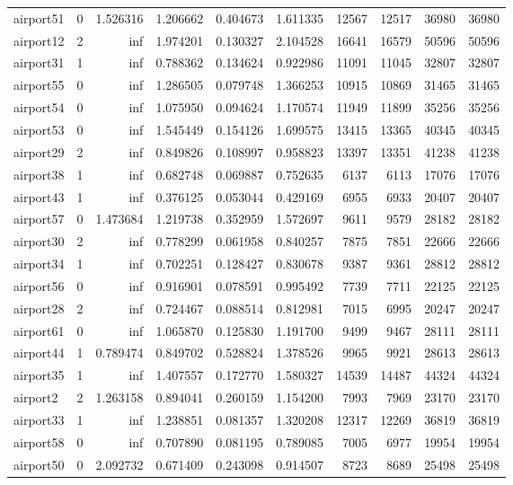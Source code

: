 \begin{longtable}{|l|r|r|r|r|r|r|r|r|r|}
airport51 & 0 & 1.526316 & 1.206662 & 0.404673 & 1.611335 & 12567 & 12517 & 36980 & 36980 \\
airport12 & 2 & inf & 1.974201 & 0.130327 & 2.104528 & 16641 & 16579 & 50596 & 50596 \\
airport31 & 1 & inf & 0.788362 & 0.134624 & 0.922986 & 11091 & 11045 & 32807 & 32807 \\
airport55 & 0 & inf & 1.286505 & 0.079748 & 1.366253 & 10915 & 10869 & 31465 & 31465 \\
airport54 & 0 & inf & 1.075950 & 0.094624 & 1.170574 & 11949 & 11899 & 35256 & 35256 \\
airport53 & 0 & inf & 1.545449 & 0.154126 & 1.699575 & 13415 & 13365 & 40345 & 40345 \\
airport29 & 2 & inf & 0.849826 & 0.108997 & 0.958823 & 13397 & 13351 & 41238 & 41238 \\
airport38 & 1 & inf & 0.682748 & 0.069887 & 0.752635 & 6137 & 6113 & 17076 & 17076 \\
airport43 & 1 & inf & 0.376125 & 0.053044 & 0.429169 & 6955 & 6933 & 20407 & 20407 \\
airport57 & 0 & 1.473684 & 1.219738 & 0.352959 & 1.572697 & 9611 & 9579 & 28182 & 28182 \\
airport30 & 2 & inf & 0.778299 & 0.061958 & 0.840257 & 7875 & 7851 & 22666 & 22666 \\
airport34 & 1 & inf & 0.702251 & 0.128427 & 0.830678 & 9387 & 9361 & 28812 & 28812 \\
airport56 & 0 & inf & 0.916901 & 0.078591 & 0.995492 & 7739 & 7711 & 22125 & 22125 \\
airport28 & 2 & inf & 0.724467 & 0.088514 & 0.812981 & 7015 & 6995 & 20247 & 20247 \\
airport61 & 0 & inf & 1.065870 & 0.125830 & 1.191700 & 9499 & 9467 & 28111 & 28111 \\
airport44 & 1 & 0.789474 & 0.849702 & 0.528824 & 1.378526 & 9965 & 9921 & 28613 & 28613 \\
airport35 & 1 & inf & 1.407557 & 0.172770 & 1.580327 & 14539 & 14487 & 44324 & 44324 \\
airport2 & 2 & 1.263158 & 0.894041 & 0.260159 & 1.154200 & 7993 & 7969 & 23170 & 23170 \\
airport33 & 1 & inf & 1.238851 & 0.081357 & 1.320208 & 12317 & 12269 & 36819 & 36819 \\
airport58 & 0 & inf & 0.707890 & 0.081195 & 0.789085 & 7005 & 6977 & 19954 & 19954 \\
airport50 & 0 & 2.092732 & 0.671409 & 0.243098 & 0.914507 & 8723 & 8689 & 25498 & 25498 \\

\end{longtable}
